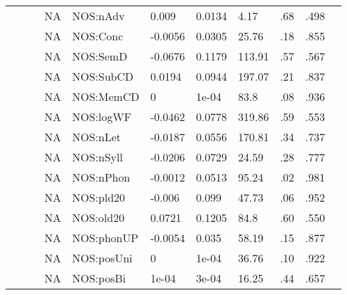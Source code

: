 \begin{table}[ht]
\begin{tabular}{lllllllllll}
   &  &  & NA & NOS:nAdv & 0.009 & 0.0134 & 4.17 & .68 & .498 &   \\ 
   &  &  & NA & NOS:Conc & -0.0056 & 0.0305 & 25.76 & .18 & .855 &   \\ 
   &  &  & NA & NOS:SemD & -0.0676 & 0.1179 & 113.91 & .57 & .567 &   \\ 
   &  &  & NA & NOS:SubCD & 0.0194 & 0.0944 & 197.07 & .21 & .837 &   \\ 
   &  &  & NA & NOS:MemCD & 0 & 1e-04 & 83.8 & .08 & .936 &   \\ 
   &  &  & NA & NOS:logWF & -0.0462 & 0.0778 & 319.86 & .59 & .553 &   \\ 
   &  &  & NA & NOS:nLet & -0.0187 & 0.0556 & 170.81 & .34 & .737 &   \\ 
   &  &  & NA & NOS:nSyll & -0.0206 & 0.0729 & 24.59 & .28 & .777 &   \\ 
   &  &  & NA & NOS:nPhon & -0.0012 & 0.0513 & 95.24 & .02 & .981 &   \\ 
   &  &  & NA & NOS:pld20 & -0.006 & 0.099 & 47.73 & .06 & .952 &   \\ 
   &  &  & NA & NOS:old20 & 0.0721 & 0.1205 & 84.8 & .60 & .550 &   \\ 
   &  &  & NA & NOS:phonUP & -0.0054 & 0.035 & 58.19 & .15 & .877 &   \\ 
   &  &  & NA & NOS:posUni & 0 & 1e-04 & 36.76 & .10 & .922 &   \\ 
   &  &  & NA & NOS:posBi & 1e-04 & 3e-04 & 16.25 & .44 & .657 &   \\ 
   \hline
\end{tabular}
\endgroup
\end{table}
